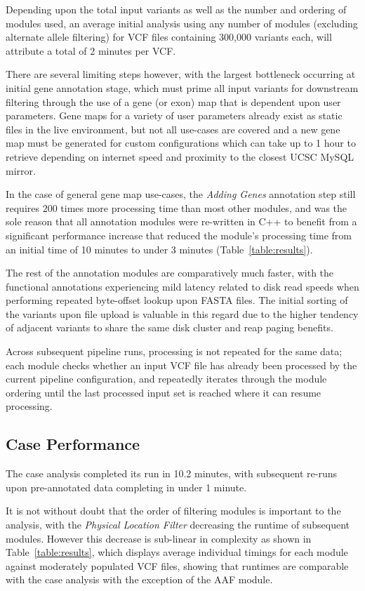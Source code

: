 \documentclass[twocolumn]{bmcart}%
\begin{document}
Depending upon the total input variants as well as the number and ordering of modules used, an average initial analysis using any number of modules (excluding alternate allele filtering) for VCF files containing 300,000 variants each, will attribute a total of 2 minutes per VCF.

There are several limiting steps however, with the largest bottleneck occurring at initial gene annotation stage, which must prime all input variants for downstream filtering through the use of a gene (or exon) map that is dependent upon user parameters. Gene maps for a variety of user parameters already exist as static files in the live environment, but not all use-cases are covered and a new gene map must be generated for custom configurations which can take up to 1 hour to retrieve depending on internet speed and proximity to the closest UCSC MySQL mirror.

In the case of general gene map use-cases, the \textit{Adding Genes} annotation step still requires 200 times more processing time than most other modules, and was the sole reason that all annotation modules were re-written in C++ to benefit from a significant performance increase that reduced the module's processing time from an initial time of 10 minutes to under 3 minutes (Table~\ref{table:results}). 

The rest of the annotation modules are comparatively much faster, with the functional annotations experiencing mild latency related to disk read speeds when performing repeated byte-offset lookup upon FASTA files. The initial sorting of the variants upon file upload is valuable in this regard due to the higher tendency of adjacent variants to share the same disk cluster and reap paging benefits.

Across subsequent pipeline runs, processing is not repeated for the same data; each module checks whether an input VCF file has already been processed by the current pipeline configuration, and repeatedly iterates through the module ordering until the last processed input set is reached where it can resume processing.

\subsection{Case Performance}

The case analysis completed its run in 10.2 minutes, with subsequent re-runs upon pre-annotated data completing in under 1 minute. 

It is not without doubt that the order of filtering modules is important to the analysis, with the \textit{Physical Location Filter} decreasing the runtime of subsequent modules. However this decrease is sub-linear in complexity as shown in Table~\ref{table:results}, which displays average individual timings for each module against moderately populated VCF files, showing that runtimes are comparable with the case analysis with the exception of the AAF module.
\end{document}
